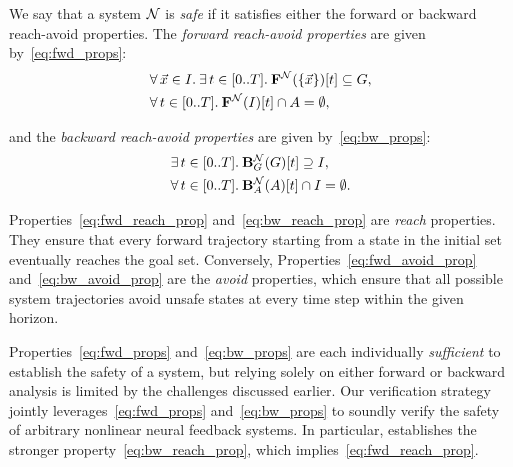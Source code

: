 \documentclass[letterpaper, 10 pt, conference]{ieeeconf}  %
\newcommand{\cb}[1]{\noindent\textcolor{magenta}{\newline CB: #1}}
\newcommand{\cb}[1]{}
\begin{document}
We say that a system $\mathcal{N}$ is \emph{safe} if it satisfies either the forward or backward reach-avoid properties. 
The \emph{forward reach-avoid properties} are given by~\eqref{eq:fwd_props}:
\begin{subequations}
\begin{align}
    &\forall\, \vec{x} \in I.\: \exists\, t \in [0..T].\: \mathbf{F}^{\mathcal{N}}(\{\vec{x}\})[t] \subseteq G, \label{eq:fwd_reach_prop}\\
    &\forall\, t \in [0..T].\: \mathbf{F}^{\mathcal{N}}(I)[t] \cap A = \emptyset, \label{eq:fwd_avoid_prop}
\end{align}
\label{eq:fwd_props}
\end{subequations}

\vspace*{-1em}
\noindent
and the \emph{backward reach-avoid properties} are given by~\eqref{eq:bw_props}:
\begin{subequations}
\begin{align}
    &\exists\, t \in [0..T].\: \mathbf{B}_G^{\mathcal{N}}(G)[t] \supseteq I, \label{eq:bw_reach_prop}\\
    &\forall\, t \in [0..T].\: \mathbf{B}_A^{\mathcal{N}}(A)[t] \cap I = \emptyset.
    \label{eq:bw_avoid_prop}
\end{align}
\label{eq:bw_props}
\end{subequations}

\vspace*{-1em}
\noindent
Properties~\eqref{eq:fwd_reach_prop} and~\eqref{eq:bw_reach_prop} are  \emph{reach} properties. 
They ensure that every forward trajectory starting from a state in the initial set eventually reaches the goal set.
Conversely, Properties~\eqref{eq:fwd_avoid_prop} and~\eqref{eq:bw_avoid_prop} are the \emph{avoid} properties, which ensure that all possible system trajectories avoid unsafe states at every time step within the given horizon. 

Properties~\eqref{eq:fwd_props} and~\eqref{eq:bw_props} are each individually \emph{sufficient} to establish the safety of a system, but relying solely on either forward or backward analysis is limited by the challenges discussed earlier.
Our verification strategy jointly leverages~\eqref{eq:fwd_props} and~\eqref{eq:bw_props} to soundly verify the safety of arbitrary nonlinear neural feedback systems. In particular, \fab establishes the stronger property~\eqref{eq:bw_reach_prop}, which implies~\eqref{eq:fwd_reach_prop}.
\end{document}
